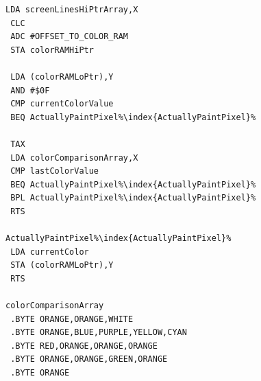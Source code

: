 \begin{minipage}[b]{0.33\linewidth}
\begin{lrbox}{\mybox}
\begin{lstlisting}[basicstyle=\ttfamily\tiny,escapechar=\%]
 LDA screenLinesHiPtrArray,X
 CLC 
 ADC #OFFSET_TO_COLOR_RAM
 STA colorRAMHiPtr

 LDA (colorRAMLoPtr),Y
 AND #$0F
 CMP currentColorValue
 BEQ ActuallyPaintPixel%\index{ActuallyPaintPixel}%

 TAX 
 LDA colorComparisonArray,X
 CMP lastColorValue
 BEQ ActuallyPaintPixel%\index{ActuallyPaintPixel}%
 BPL ActuallyPaintPixel%\index{ActuallyPaintPixel}%
 RTS 

ActuallyPaintPixel%\index{ActuallyPaintPixel}%   
 LDA currentColor
 STA (colorRAMLoPtr),Y
 RTS 

colorComparisonArray   
 .BYTE ORANGE,ORANGE,WHITE
 .BYTE ORANGE,BLUE,PURPLE,YELLOW,CYAN
 .BYTE RED,ORANGE,ORANGE,ORANGE
 .BYTE ORANGE,ORANGE,GREEN,ORANGE
 .BYTE ORANGE
\end{lstlisting}
\end{lrbox}%
\scalebox{0.8}{\usebox{\mybox}}
\end{minipage}
\hspace{0.5cm}
